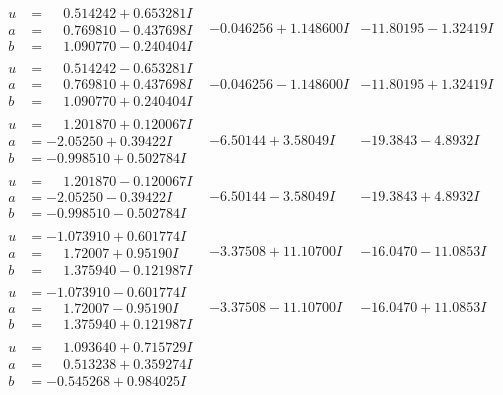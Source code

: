 \documentclass[1p]{elsarticle_modified}
\theoremstyle{definition}
\begin{document}
$$\begin{array}{c|c|c}
\begin{aligned}
u &= \phantom{-}0.514242 + 0.653281 I \\
a &= \phantom{-}0.769810 - 0.437698 I \\
b &= \phantom{-}1.090770 - 0.240404 I\end{aligned}
 & -0.046256 + 1.148600 I & -11.80195 - 1.32419 I \\ \hline\begin{aligned}
u &= \phantom{-}0.514242 - 0.653281 I \\
a &= \phantom{-}0.769810 + 0.437698 I \\
b &= \phantom{-}1.090770 + 0.240404 I\end{aligned}
 & -0.046256 - 1.148600 I & -11.80195 + 1.32419 I \\ \hline\begin{aligned}
u &= \phantom{-}1.201870 + 0.120067 I \\
a &= -2.05250 + 0.39422 I \\
b &= -0.998510 + 0.502784 I\end{aligned}
 & -6.50144 + 3.58049 I & -19.3843 - 4.8932 I \\ \hline\begin{aligned}
u &= \phantom{-}1.201870 - 0.120067 I \\
a &= -2.05250 - 0.39422 I \\
b &= -0.998510 - 0.502784 I\end{aligned}
 & -6.50144 - 3.58049 I & -19.3843 + 4.8932 I \\ \hline\begin{aligned}
u &= -1.073910 + 0.601774 I \\
a &= \phantom{-}1.72007 + 0.95190 I \\
b &= \phantom{-}1.375940 - 0.121987 I\end{aligned}
 & -3.37508 + 11.10700 I & -16.0470 - 11.0853 I \\ \hline\begin{aligned}
u &= -1.073910 - 0.601774 I \\
a &= \phantom{-}1.72007 - 0.95190 I \\
b &= \phantom{-}1.375940 + 0.121987 I\end{aligned}
 & -3.37508 - 11.10700 I & -16.0470 + 11.0853 I \\ \hline\begin{aligned}
u &= \phantom{-}1.093640 + 0.715729 I \\
a &= \phantom{-}0.513238 + 0.359274 I \\
b &= -0.545268 + 0.984025 I\end{aligned}

\end{array}$$
\end{document}

